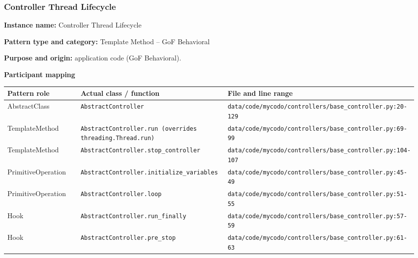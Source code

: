 \documentclass[11pt,a4paper]{article}
\newcommand{\field}[2]{\textbf{#1:} #2\par}
\begin{document}
\subsubsection{Controller Thread Lifecycle}
\field{Instance name}{Controller Thread Lifecycle}
\field{Pattern type and category}{Template Method -- GoF Behavioral}
\field{Purpose and origin}{application code (GoF Behavioral).}
\textbf{Participant mapping}\par
{\small\setlength{\tabcolsep}{3pt}
\begin{longtable}{@{}P{0.21\linewidth}P{0.37\linewidth}P{0.39\linewidth}@{}}\toprule
\textbf{Pattern role} & \textbf{Actual class / function} & \textbf{File and line range} \\ \midrule\endhead
AbstractClass & \texttt{AbstractController} & \texttt{data/\allowbreak{}code/\allowbreak{}mycodo/\allowbreak{}controllers/\allowbreak{}base\_\allowbreak{}controller.\allowbreak{}py:20-129} \\
TemplateMethod & \texttt{AbstractController.\allowbreak{}run (overrides threading.\allowbreak{}Thread.\allowbreak{}run)} & \texttt{data/\allowbreak{}code/\allowbreak{}mycodo/\allowbreak{}controllers/\allowbreak{}base\_\allowbreak{}controller.\allowbreak{}py:69-99} \\
TemplateMethod & \texttt{AbstractController.\allowbreak{}stop\_\allowbreak{}controller} & \texttt{data/\allowbreak{}code/\allowbreak{}mycodo/\allowbreak{}controllers/\allowbreak{}base\_\allowbreak{}controller.\allowbreak{}py:104-107} \\
PrimitiveOperation & \texttt{AbstractController.\allowbreak{}initialize\_\allowbreak{}variables} & \texttt{data/\allowbreak{}code/\allowbreak{}mycodo/\allowbreak{}controllers/\allowbreak{}base\_\allowbreak{}controller.\allowbreak{}py:45-49} \\
PrimitiveOperation & \texttt{AbstractController.\allowbreak{}loop} & \texttt{data/\allowbreak{}code/\allowbreak{}mycodo/\allowbreak{}controllers/\allowbreak{}base\_\allowbreak{}controller.\allowbreak{}py:51-55} \\
Hook & \texttt{AbstractController.\allowbreak{}run\_\allowbreak{}finally} & \texttt{data/\allowbreak{}code/\allowbreak{}mycodo/\allowbreak{}controllers/\allowbreak{}base\_\allowbreak{}controller.\allowbreak{}py:57-59} \\
Hook & \texttt{AbstractController.\allowbreak{}pre\_\allowbreak{}stop} & \texttt{data/\allowbreak{}code/\allowbreak{}mycodo/\allowbreak{}controllers/\allowbreak{}base\_\allowbreak{}controller.\allowbreak{}py:61-63} \\

\end{longtable}}
\end{document}
